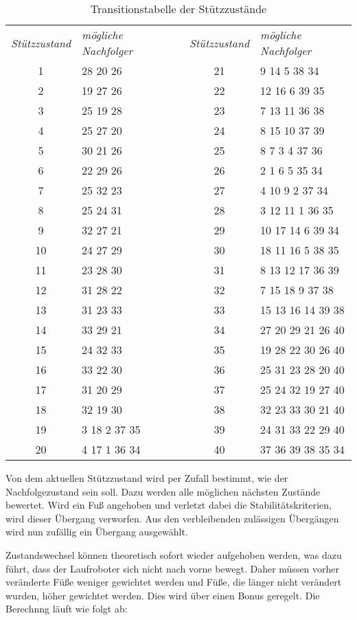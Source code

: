 \begin{table}[b!]
\begin{tabular}{|c|l|c|c|l|} 
\cline{1-2}\cline{4-5}
\emph{Stützzustand} & \emph{mögliche Nachfolger} & &\emph{Stützzustand} & \emph{mögliche Nachfolger} \\
\cline{1-2}\cline{4-5}
1 & 28 20 26  & & 21&9 14 5 38 34 \\
2 & 19 27 26  & & 22&12 16 6 39 35 \\
3 & 25 19 28  & & 23&7 13 11 36 38 \\
4 & 25 27 20  & & 24&8 15 10 37 39 \\
5 & 30 21 26  & & 25&8 7 3 4 37 36 \\
6 & 22 29 26  & & 26&2 1 6 5 35 34 \\
7 & 25 32 23  & & 27&4 10 9 2 37 34 \\
8 & 25 24 31  & & 28&3 12 11 1 36 35 \\
9 & 32 27 21  & & 29&10 17 14 6 39 34 \\
10 & 24 27 29  & & 30&18 11 16 5 38 35 \\
11 & 23 28 30  & & 31&8 13 12 17 36 39 \\
12 & 31 28 22  & & 32&7 15 18 9 37 38 \\
13 & 31 23 33  & & 33&15 13 16 14 39 38 \\
14 & 33 29 21  & & 34&27 20 29 21 26 40 \\
15 & 24 32 33  & & 35&19 28 22 30 26 40 \\
16 & 33 22 30  & & 36&25 31 23 28 20 40 \\
17 & 31 20 29  & & 37&25 24 32 19 27 40 \\
18 & 32 19 30  & & 38&32 23 33 30 21 40 \\
19 & 3 18 2 37 35  & & 39&24 31 33 22 29 40 \\
20 & 4 17 1 36 34  & & 40&37 36 39 38 35 34 \\
\cline{1-2}\cline{4-5}
\end{tabular}
\caption{\label{trans_support} Transitionstabelle der Stützzustände \autocite{herms2004}}
\end{table}

Von dem aktuellen Stützzustand wird per Zufall bestimmt, wie der Nachfolgezustand sein soll. Dazu werden alle möglichen nächsten Zustände bewertet. Wird ein Fuß angehoben und verletzt dabei die Stabilitätskriterien, wird dieser Übergang verworfen. Aus den verbleibenden zulässigen Übergängen wird nun zufällig ein Übergang ausgewählt.

Zustandswechsel können theoretisch sofort wieder aufgehoben werden, was dazu führt, dass der Laufroboter sich nicht nach vorne bewegt. Daher müssen vorher veränderte Füße weniger gewichtet werden und Füße, die länger nicht verändert wurden, höher gewichtet werden. Dies wird über einen Bonus geregelt. Die Berechnng läuft wie folgt ab:

